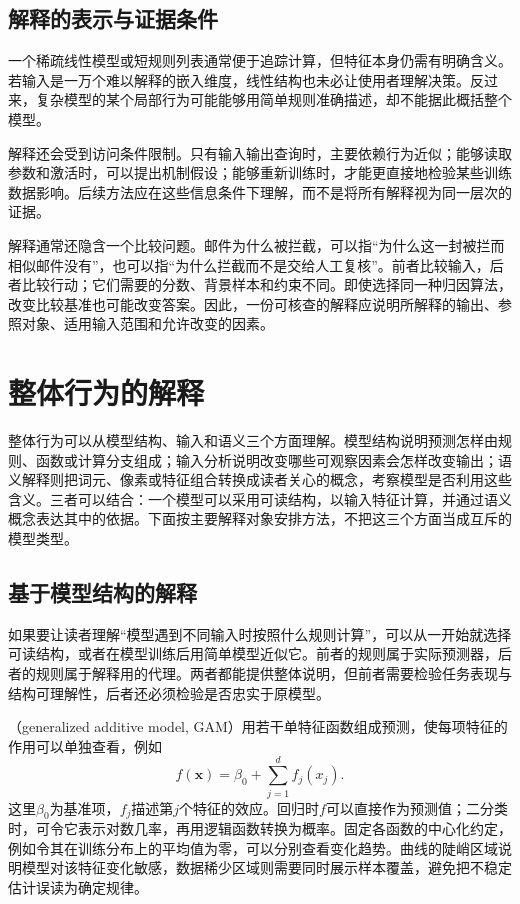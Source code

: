 \subsection{解释的表示与证据条件}

一个稀疏线性模型或短规则列表通常便于追踪计算，但特征本身仍需有明确含义。若输入是一万个难以解释的嵌入维度，线性结构也未必让使用者理解决策。反过来，复杂模型的某个局部行为可能能够用简单规则准确描述，却不能据此概括整个模型。

解释还会受到访问条件限制。只有输入输出查询时，主要依赖行为近似；能够读取参数和激活时，可以提出机制假设；能够重新训练时，才能更直接地检验某些训练数据影响。后续方法应在这些信息条件下理解，而不是将所有解释视为同一层次的证据。

解释通常还隐含一个比较问题。邮件为什么被拦截，可以指“为什么这一封被拦而相似邮件没有”，也可以指“为什么拦截而不是交给人工复核”。前者比较输入，后者比较行动；它们需要的分数、背景样本和约束不同。即使选择同一种归因算法，改变比较基准也可能改变答案。因此，一份可核查的解释应说明所解释的输出、参照对象、适用输入范围和允许改变的因素。

\section{整体行为的解释}
\label{sec:interpretability-global}

整体行为可以从模型结构、输入和语义三个方面理解。模型结构说明预测怎样由规则、函数或计算分支组成；输入分析说明改变哪些可观察因素会怎样改变输出；语义解释则把词元、像素或特征组合转换成读者关心的概念，考察模型是否利用这些含义。三者可以结合：一个模型可以采用可读结构，以输入特征计算，并通过语义概念表达其中的依据。下面按主要解释对象安排方法，不把这三个方面当成互斥的模型类型。

\subsection{基于模型结构的解释}
\label{sec:interpretability-global-response}

如果要让读者理解“模型遇到不同输入时按照什么规则计算”，可以从一开始就选择可读结构，或者在模型训练后用简单模型近似它。前者的规则属于实际预测器，后者的规则属于解释用的代理。两者都能提供整体说明，但前者需要检验任务表现与结构可理解性，后者还必须检验是否忠实于原模型。

（generalized additive model, GAM）用若干单特征函数组成预测，使每项特征的作用可以单独查看，例如
\begin{equation}
 f(\bm{x})=\beta_0+\sum_{j=1}^{d}f_j(x_j).
 \label{eq:interpretability-gam}
\end{equation}
这里$\beta_0$为基准项，$f_j$描述第$j$个特征的效应。回归时$f$可以直接作为预测值；二分类时，可令它表示对数几率，再用逻辑函数转换为概率。固定各函数的中心化约定，例如令其在训练分布上的平均值为零，可以分别查看变化趋势。曲线的陡峭区域说明模型对该特征变化敏感，数据稀少区域则需要同时展示样本覆盖，避免把不稳定估计误读为确定规律。

